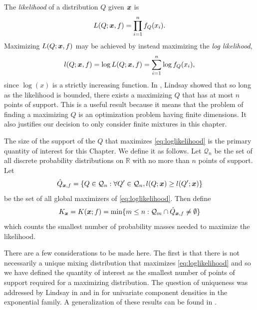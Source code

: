 	The \emph{likelihood} of a distribution $Q$ given ${\bm{{x}}}$ is 
	\begin{equation}
		L(Q;{\bm{{x}}}, f) = \prod_{i = 1}^n f_Q(x_i).
	\end{equation}
	Maximizing $L(Q;{\bm{{x}}}, f)$ may be achieved by instead maximizing the \emph{log likelihood},
	\begin{equation}
		l(Q; {\bm{{x}}}, f) = \log L(Q; {\bm{{x}}}, f) = \sum_{i = 1}^n \log f_Q(x_i),
		\label{eq:loglikelihood}
	\end{equation}
	since $\log(x)$ is a strictly increasing function. In \cite{Lindsay1983-tf}, Lindsay showed that so long as the likelihood is bounded, there exists a maximizing $Q$ that has at most $n$ points of support. This is a useful result because it means that the problem of finding a maximizing $Q$ is an optimization problem having finite dimensions. It also justifies our decision to only consider finite mixtures in this chapter.

	The size of the support of the $Q$ that maximizes \eqref{eq:loglikelihood} is the primary quantity of interest for this Chapter. We define it as follows. Let $\mathcal{Q}_n$ be the set of all discrete probability distributions on $\mathbb{R}$ with no more than $n$ points of support. Let
	\begin{equation}
		\hat{Q}_{{\bm{{x}}},f} = \{Q \in \mathcal{Q}_n: \forall Q' \in \mathcal{Q}_n, l(Q;{\bm{{x}}}) \geq l(Q';{\bm{{x}}})\}
	\end{equation}
	be the set of all global maximizers of \eqref{eq:loglikelihood}. Then define
	\begin{equation}
		K_{\bm{{x}}} = K({\bm{{x}}}; f) = \min\{m \leq n : \mathcal{Q}_m \cap \hat{Q}_{{\bm{{x}}},f} \neq \emptyset\}
	\end{equation}
	which counts the smallest number of probability masses needed to maximize the likelihood.


	There are a few considerations to be made here. The first is that there is not necessarily a unique mixing distribution that maximizes \eqref{eq:loglikelihood} and so we have defined the quantity of interest as the smallest number of points of support required for a maximizing distribution. The question of uniqueness was addressed by Lindsay in \cite{Lindsay1983-tf} and in \cite{Lindsay1983a-he} for univariate component densities in the exponential family. A generalization of these results can be found in \cite{Lindsay1993-rj}.

